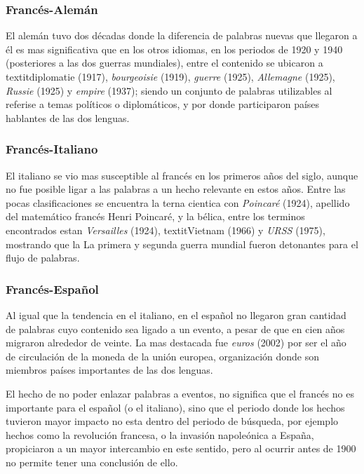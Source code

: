 \subsubsection*{Francés-Alemán}%

El alemán tuvo dos décadas donde la diferencia de palabras nuevas que llegaron a él es mas significativa que en los otros idiomas, en los periodos de 1920 y 1940  (posteriores a las dos guerras mundiales), entre el contenido se ubicaron a  textit{diplomatie} (1917), \textit{bourgeoisie} (1919),  \textit{guerre} (1925), \textit{Allemagne} (1925), \textit{Russie} (1925) y \textit{empire} (1937); siendo un conjunto de palabras utilizables al referise a temas políticos  o diplomáticos, y por donde participaron países hablantes de las dos lenguas. 


\subsubsection*{Francés-Italiano}%

El italiano se vio mas susceptible al francés en los primeros años del siglo, aunque no fue posible ligar a las palabras a un hecho relevante en estos años. Entre las pocas clasificaciones se encuentra la terna cientica con \textit{Poincaré} (1924), apellido del matemático francés Henri Poincaré, y la bélica,  entre los terminos encontrados estan \textit{Versailles} (1924), textit{Vietnam} (1966)  y \textit{URSS} (1975), mostrando que la  La primera y segunda guerra mundial fueron detonantes para el flujo de palabras.


\subsubsection*{Francés-Español}%

Al igual que la tendencia en el italiano, en el español no llegaron gran cantidad de palabras cuyo contenido sea ligado a un evento, a pesar de que en cien años migraron alrededor de veinte. La mas destacada fue \textit{euros} (2002) por ser el año de circulación de la moneda de la unión europea, organización donde son miembros países importantes de las dos lenguas. 

El hecho de no poder enlazar palabras a eventos, no significa que el francés no es importante para el español (o el italiano), sino que el periodo donde los hechos tuvieron mayor impacto no esta dentro del periodo de búsqueda,  por ejemplo hechos como la revolución francesa, o la invasión napoleónica a España, propiciaron a un mayor intercambio en este sentido, pero al ocurrir antes de 1900 no permite tener una conclusión de ello. 


